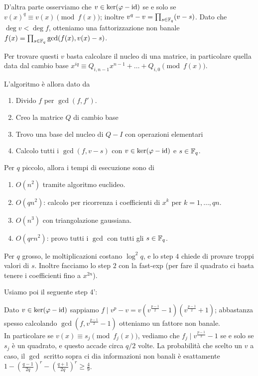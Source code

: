\documentclass[a4paper]{book}
\begin{document}
    D'altra parte osserviamo che $v\in\ker(\varphi-\operatorname{id})$ se e solo se $v(x)^q\equiv v(x)\pmod{f(x)}$; inoltre $v^q-v=\prod_{s\in\mathbb{F}_q}(v-s)$. Dato che $\deg v<\deg f$, otteniamo una fattorizzazione non banale $f(x)=\prod_{s\in\mathbb{F}_q}\gcd(f(x),v(x)-s)$.

    Per trovare questi $v$ basta calcolare il nucleo di una matrice, in particolare quella data dal cambio base $x^{iq}\equiv Q_{i,n-1}x^{n-1}+\dots+Q_{i,0}\pmod{f(x)}$.

    L'algoritmo è allora dato da
    \begin{enumerate}
        \item Divido $f$ per $\gcd(f,f')$.
        \item Creo la matrice $Q$ di cambio base
        \item Trovo una base del nucleo di $Q-I$ con operazioni elementari
        \item Calcolo tutti i $\gcd(f,v-s)$ con $v\in\ker(\varphi-\operatorname{id})$ e $s\in\mathbb{F}_q$.
    \end{enumerate}

    Per $q$ piccolo, allora i tempi di esecuzione sono di
    \begin{enumerate}
        \item $O(n^2)$ tramite algoritmo euclideo.
        \item $O(qn^2)$: calcolo per ricorrenza i coefficienti di $x^k$ per $k=1,\dots,qn$.
        \item $O(n^3)$ con triangolazione gaussiana.
        \item $O(qrn^2)$: provo tutti i $\gcd$ con tutti gli $s\in\mathbb{F}_q$.
    \end{enumerate}

    Per $q$ grosso, le moltiplicazioni costano $\log^2q$, e lo step $4$ chiede di provare troppi valori di $s$. Inoltre facciamo lo step $2$ con la fast-exp (per fare il quadrato ci basta tenere i coefficienti fino a $x^{2n}$).

    Usiamo poi il seguente step 4':

    Dato $v\in\ker(\varphi-\operatorname{id})$ sappiamo $f\mid v^p-v=v(v^{\frac{p-1}{2}}-1)(v^{\frac{p-1}{2}}+1)$; abbastanza spesso calcolando $\gcd(f,v^{\frac{p-1}{2}}-1)$ otteniamo un fattore non banale.\\
    In particolare se $v(x)\equiv s_j\pmod{f_j(x)}$, vediamo che $f_j\mid v^{\frac{p-1}{2}}-1 $ se e solo se $s_j$ è un quadrato, e questo accade circa $q/2$ volte. La probabilità che scelto un $v$ a caso, il $\gcd$ scritto sopra ci dia informazioni non banali è esattamente $1-\left(\frac{q-1}{2q}\right)^r-\left(\frac{q+1}{2q}\right)^r\ge\frac49$.
\end{document}
